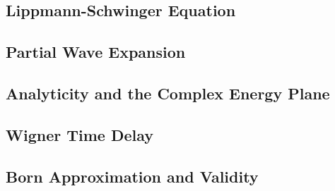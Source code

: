 \subsection{Lippmann-Schwinger Equation}
\subsection{Partial Wave Expansion}
\subsection{Analyticity and the Complex Energy Plane}
\subsection{Wigner Time Delay}
\subsection{Born Approximation and Validity}